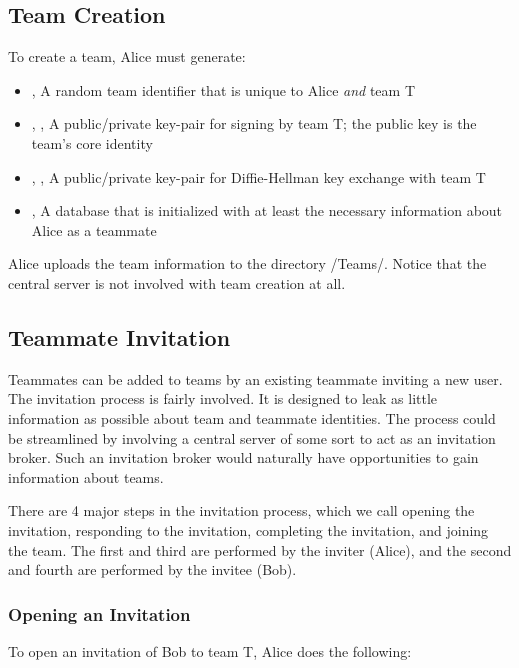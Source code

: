 \documentclass[pldi,10pt]{sigplanconf-pldi16}
\begin{document}
\subsection{Team Creation}

To create a team, Alice must generate:

\begin{itemize}
\item {}, A random team identifier that is unique to Alice \emph{and} team T
\item {}, , A public/private key-pair for signing by team T; the public key is the team's core identity
\item {}, , A public/private key-pair for Diffie-Hellman key exchange with team T
\item {}, A database that is initialized with at least the necessary information about Alice as a teammate
\end{itemize}

Alice uploads the team information to the directory \slash Teams\slash {}.
Notice that the central server is not involved with team creation at all.

\subsection{Teammate Invitation}

Teammates can be added to teams by an existing teammate inviting a new user.
The invitation process is fairly involved.
It is designed to leak as little information as possible about team and teammate identities.
The process could be streamlined by involving a central server of some sort to act as an invitation broker.
Such an invitation broker would naturally have opportunities to gain information about teams.

There are 4 major steps in the invitation process, which we call opening the invitation, responding to the invitation, completing the invitation, and joining the team.
The first and third are performed by the inviter (Alice), and the second and fourth are performed by the invitee (Bob).

\subsubsection{Opening an Invitation}

To open an invitation of Bob to team T, Alice does the following:
\end{document}
